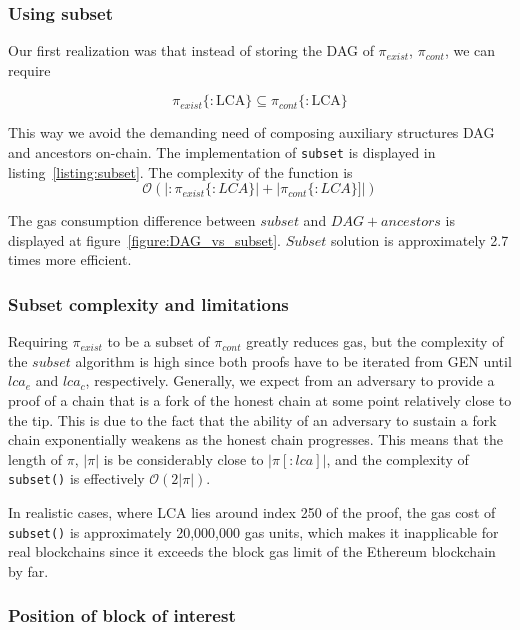 \subsubsection{Using subset} Our first realization was that instead of storing the
DAG of $\pi_{exist}$, $\pi_{cont}$, we can require

\[ \pi_{exist}\{:\textrm{LCA}\} \subseteq \pi_{cont}\{:\textrm{LCA}\} \]

This way we avoid the demanding need of composing auxiliary structures DAG and
ancestors on-chain. The implementation of \texttt{subset} is displayed in
listing~\ref{listing:subset}. The complexity of the function is \[
\mathcal{O}(|:\pi_{exist}\{:LCA\}| + |\pi_{cont}\{:LCA\}]|) \]





The gas consumption difference between $subset$ and $DAG + ancestors$ is
displayed at figure~\ref{figure:DAG_vs_subset}. $Subset$ solution is
approximately 2.7 times more efficient.



\subsubsection{Subset complexity and limitations}

Requiring $\pi_{exist}$ to be a subset of $\pi_{cont}$ greatly reduces gas, but
the complexity of the $subset$ algorithm is high since both proofs have to be
iterated from GEN until $lca_e$ and $lca_c$, respectively. Generally, we expect
from an adversary to provide a proof of a chain that is a fork of the honest
chain at some point relatively close to the tip. This is due to the fact that
the ability of an adversary to sustain a fork chain exponentially weakens as
the honest chain progresses. This means that the length of $\pi$, $|\pi|$ is be
considerably close to $|\pi[:lca]|$, and the complexity of \texttt{subset()} is
effectively $\mathcal{O}(2|\pi|)$.

In realistic cases, where LCA lies around index 250 of the proof, the gas cost
of \texttt{subset()} is approximately 20,000,000 gas units, which makes it
inapplicable for real blockchains since it exceeds the block gas limit of the
Ethereum blockchain by far.

\subsubsection{Position of block of interest}

